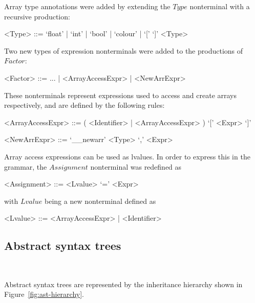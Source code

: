 \documentclass[11pt,a4paper]{scrartcl}
\begin{document}
Array type annotations were added by extending the $Type$ nonterminal with a recursive production:
\begin{grammar}
  <Type> ::= `float' | `int' | `bool' | `colour' | `[' `]' <Type>
\end{grammar}

Two new types of expression nonterminals were added to the productions of $Factor$:
\begin{grammar}
  <Factor> ::= ... | <ArrayAccessExpr> | <NewArrExpr>
\end{grammar}

These nonterminals represent expressions used to access and create arrays respectively, and are defined by the following rules:
\begin{grammar}
  <ArrayAccessExpr> ::= ( <Identifier> | <ArrayAccessExpr> ) `[' <Expr> `]'\\
\end{grammar}
\begin{grammar}
  <NewArrExpr> ::= `__newarr' <Type> `,' <Expr>
\end{grammar}

Array access expressions can be used as lvalues. In order to express this in the grammar, the $Assignment$ nonterminal was redefined as
\begin{grammar}
  <Assignment> ::= <Lvalue> `=' <Expr>
\end{grammar}
with $Lvalue$ being a new nonterminal defined as
\begin{grammar}
  <Lvalue> ::= <ArrayAccessExpr> | <Identifier>
\end{grammar}

\subsection{Abstract syntax trees}~\label{sec:ast}

Abstract syntax trees are represented by the inheritance hierarchy shown in Figure~\ref{fig:ast-hierarchy}.
\end{document}
